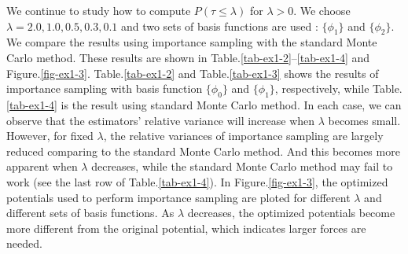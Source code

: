 \documentclass[final]{siamltex}
\begin{document}
We continue to study how to compute $P(\tau \le \lambda)$ for $\lambda > 0$.
We choose $\lambda = 2.0, 1.0, 0.5, 0.3, 0.1$ and two sets of basis functions are used : $\{\phi_1\}$
and $\{\phi_2\}$. We compare the results using importance sampling with the
standard Monte Carlo method. These results are shown in
Table.\ref{tab-ex1-2}--\ref{tab-ex1-4} and Figure.\ref{fig-ex1-3}.
Table.\ref{tab-ex1-2} and Table.\ref{tab-ex1-3} shows the results of
importance sampling with basis function $\{\phi_0\}$ and $\{\phi_1\}$,
respectively, while Table.\ref{tab-ex1-4} is the result using standard Monte Carlo method.
In each case, we can observe that the estimators' relative variance will increase when $\lambda$ becomes
small. However, for fixed $\lambda$, the relative variances of importance
sampling are largely reduced comparing to the standard Monte Carlo method. And this becomes
more apparent when $\lambda$ decreases, while the standard Monte Carlo method
may fail to work (see the last row of Table.\ref{tab-ex1-4}).
In Figure.\ref{fig-ex1-3}, the optimized potentials used to perform importance sampling
are ploted for different $\lambda$ and different sets of basis functions. As
$\lambda$ decreases,
the optimized potentials become more different from the original
potential, which indicates larger forces are needed.
\end{document}
